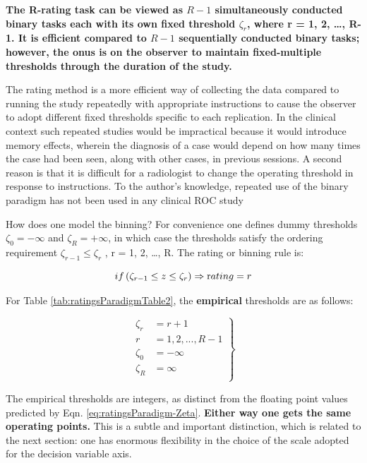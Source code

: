 \documentclass[
]{book}
\begin{document}
\textbf{The R-rating task can be viewed as \(R-1\) simultaneously conducted binary tasks each with its own fixed threshold \(\zeta_r\), where r = 1, 2, \ldots, R-1. It is efficient compared to \(R-1\) sequentially conducted binary tasks; however, the onus is on the observer to maintain fixed-multiple thresholds through the duration of the study.}

The rating method is a more efficient way of collecting the data compared to running the study repeatedly with appropriate instructions to cause the observer to adopt different fixed thresholds specific to each replication. In the clinical context such repeated studies would be impractical because it would introduce memory effects, wherein the diagnosis of a case would depend on how many times the case had been seen, along with other cases, in previous sessions. A second reason is that it is difficult for a radiologist to change the operating threshold in response to instructions. To the author's knowledge, repeated use of the binary paradigm has not been used in any clinical ROC study

How does one model the binning? For convenience one defines dummy thresholds \(\zeta_0 = - \infty\) and \(\zeta_R = + \infty\), in which case the thresholds satisfy the ordering requirement \(\zeta_{r-1} \le \zeta_r\) , r = 1, 2, \ldots, R. The rating or binning rule is:

\begin{equation} 
if \left (\zeta_{r-1} \le z \le \zeta_r  \right )\Rightarrow \text rating = r
\label{eq:ratingsParadigm-binningRule}
\end{equation}

For Table \ref{tab:ratingsParadigmTable2}, the \textbf{empirical} thresholds are as follows:

\begin{equation} 
\left.
\begin{aligned}
\zeta_r &= r + 1 \\
r & = 1, 2, ..., R-1\\
\zeta_0 &= -\infty\\
\zeta_R &= \infty\\
\end{aligned}
\right \}
\label{eq:ratingsParadigm-EmpZeta}
\end{equation}

The empirical thresholds are integers, as distinct from the floating point values predicted by Eqn. \eqref{eq:ratingsParadigm-Zeta}. \textbf{Either way one gets the same operating points.} This is a subtle and important distinction, which is related to the next section: one has enormous flexibility in the choice of the scale adopted for the decision variable axis.
\end{document}
